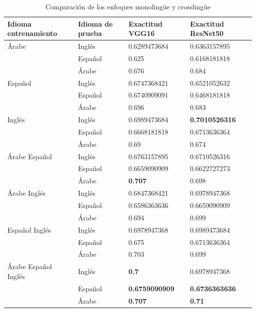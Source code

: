 \documentclass[runningheads]{llncs}
\begin{document}
\begin{table}
\caption{Comparación de los enfoques monolingüe y crosslingüe}
\centering
\begin{tabular}{|l|l|l|l|} 
\hline
Idioma entrenamiento & Idioma de prueba & Exactitud VGG16 & Exactitud ResNet50  \\ 
\hline
Árabe                & Inglés           & 0.6289473684    & 0.6363157895        \\ 
\cline{2-4}
                     & Español          & 0.625           & 0.6168181818        \\ 
\cline{2-4}
                     & Árabe            & 0.676           & 0.684               \\ 
\hline
Español              & Inglés           & 0.6747368421    & 0.6521052632        \\ 
\cline{2-4}
                     & Español          & 0.6740909091    & 0.6468181818        \\ 
\cline{2-4}
                     & Árabe            & 0.696           & 0.683               \\ 
\hline
Inglés               & Inglés           & 0.6989473684    & \textbf{0.7010526316}        \\ 
\cline{2-4}
                     & Español          & 0.6668181818    & 0.6713636364        \\ 
\cline{2-4}
                     & Árabe            & 0.69            & 0.674               \\ 
\hline
Árabe Español        & Inglés           & 0.6763157895    & 0.6710526316        \\ 
\cline{2-4}
                     & Español          & 0.6659090909    & 0.6622727273        \\ 
\cline{2-4}
                     & Árabe            & \textbf{0.707}          & 0.698               \\ 
\hline
Árabe Inglés         & Inglés           & 0.6847368421    & 0.6978947368        \\ 
\cline{2-4}
                     & Español          & 0.6586363636    & 0.6659090909        \\ 
\cline{2-4}
                     & Árabe            & 0.694           & 0.699               \\ 
\hline
Español Inglés       & Inglés           & 0.6978947368    & 0.6989473684        \\ 
\cline{2-4}
                     & Español          & 0.675           & 0.6713636364        \\ 
\cline{2-4}
                     & Árabe            & 0.703           & 0.699               \\ 
\hline
Árabe Español Inglés & Inglés           & \textbf{0.7}             & 0.6978947368        \\ 
\cline{2-4}
                     & Español          & \textbf{0.6759090909}    & \textbf{0.6736363636}        \\ 
\cline{2-4}
                     & Árabe            & \textbf{0.707}           & \textbf{0.71}                \\
\hline
\end{tabular}
\end{table}
\end{document}
